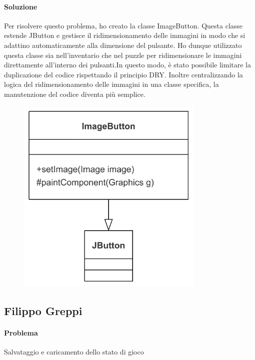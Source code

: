 \documentclass[a4paper,12pt]{report}
\begin{document}
\paragraph{Soluzione}Per risolvere questo problema, ho creato la classe ImageButton. Questa classe estende JButton e gestisce il ridimensionamento delle immagini in modo che si adattino automaticamente alla dimensione del pulsante. Ho dunque utilizzato questa classe sia nell'inventario che nel puzzle per ridimensionare le immagini direttamente all'interno dei pulsanti.In questo modo, è stato possibile limitare la duplicazione del codice rispettando il principio DRY. Inoltre centralizzando la logica del ridimensionamento delle immagini in una classe specifica, la manutenzione del codice diventa più semplice. 
\begin{figure}[h]  %
    \centering
    \includegraphics[width=0.8\textwidth]{img/button.png}  %
    \label{img:button}
\end{figure}
%
\subsection{Filippo Greppi}
%
%
\paragraph{Problema} Salvataggio e caricamento dello stato di gioco
\end{document}
